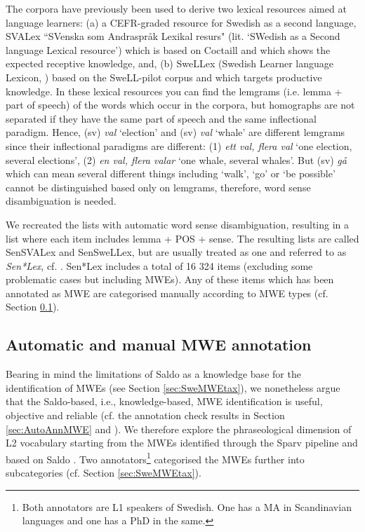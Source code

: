 \documentclass[output=paper,colorlinks,citecolor=brown]{langscibook}
\begin{document}
The corpora have previously been used to derive two lexical resources aimed at language learners: (a) a CEFR-graded resource for Swedish as a second language, SVALex ``SVenska som Andraspr{\aa}k Lexikal resurs" (lit. `SWedish as a Second language Lexical resource')
\citep{franccois2016svalex} which is based on Coctaill and which shows the expected receptive knowledge, and, (b) SweLLex (Swedish Learner language Lexicon, \cite{volodina2016swellex}) based on the SweLL-pilot corpus and which targets productive knowledge. In these lexical resources you can find the lemgrams (i.e. lemma + part of speech) of the words which occur in the corpora, but homographs are not separated if they have the same part of speech and the same inflectional paradigm. Hence, (sv) \textit{val} `election' and (sv) \textit{val} `whale' are different lemgrams since their inflectional paradigms are different: (1) \textit{ett val, flera val} `one election, several elections', (2) \textit{en val, flera valar} `one whale, several whales'. But (sv) \textit{gå} which can mean several different things including `walk', `go' or `be possible' cannot be distinguished based only on lemgrams, therefore, word sense disambiguation is needed.

We recreated the lists with automatic word sense disambiguation, resulting in a list where each item includes lemma + POS + sense. 
The resulting lists are called SenSVALex and SenSweLLex, but are usually treated as one and referred to as \textit{Sen*Lex}, cf. \citet[][31--32]{alfter2021exploring}. Sen*Lex includes a total of 16 324 items (excluding some problematic cases but including MWEs). Any of these items which has been annotated as MWE are categorised manually according to MWE types (cf. Section \ref{sec:manMWEann}).


\subsection{Automatic and manual MWE annotation}\label{sec:manMWEann}

Bearing in mind the limitations of Saldo as a knowledge base for the identification of MWEs (see Section \ref{sec:SweMWEtax}), we nonetheless argue that the Saldo-based, i.e., knowledge-based, MWE identification is useful, objective and reliable (cf. the annotation check results in Section \ref{sec:AutoAnnMWE} and \citealt{volodina2022annotation}). We therefore explore the phraseological dimension of L2 vocabulary starting from the MWEs identified through the Sparv pipeline \citep{borin2016sparv} and based on Saldo \citep{borin2013saldo}. Two annotators\footnote{Both annotators are L1 speakers of Swedish. One has a MA in Scandinavian languages and one has a PhD in the same.} categorised the MWEs further into subcategories (cf. Section \ref{sec:SweMWEtax}).
 
\end{document}
